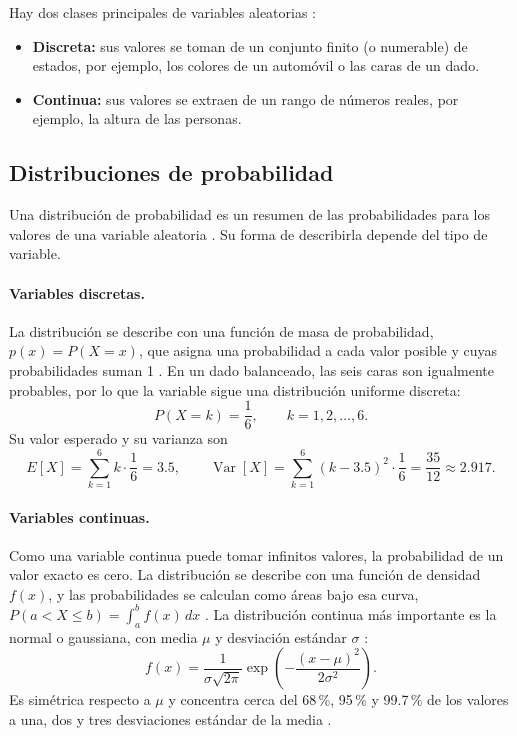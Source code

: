 \documentclass[11pt,letterpaper]{article}
\begin{document}
Hay dos clases principales de variables aleatorias \parencite{tecnm2026_documento_fuente,brownlee2020}:

\begin{itemize}
    \item \textbf{Discreta:} sus valores se toman de un conjunto finito (o numerable) de estados, por ejemplo, los colores de un automóvil o las caras de un dado.
    \item \textbf{Continua:} sus valores se extraen de un rango de números reales, por ejemplo, la altura de las personas.
\end{itemize}

\subsection{Distribuciones de probabilidad}

Una distribución de probabilidad es un resumen de las probabilidades para los valores de una variable aleatoria \parencite{tecnm2026_documento_fuente}. Su forma de describirla depende del tipo de variable.

\paragraph{Variables discretas.} La distribución se describe con una función de masa de probabilidad, $p(x) = P(X = x)$, que asigna una probabilidad a cada valor posible y cuyas probabilidades suman 1 \parencite{brownlee2020}. En un dado balanceado, las seis caras son igualmente probables, por lo que la variable sigue una distribución uniforme discreta:
\begin{equation}
    P(X = k) = \frac{1}{6}, \qquad k = 1, 2, \ldots, 6.
\end{equation}
Su valor esperado y su varianza son
\begin{equation}
    E[X] = \sum_{k=1}^{6} k \cdot \frac{1}{6} = 3.5, \qquad
    \operatorname{Var}[X] = \sum_{k=1}^{6} (k - 3.5)^2 \cdot \frac{1}{6} = \frac{35}{12} \approx 2.917.
\end{equation}

\paragraph{Variables continuas.} Como una variable continua puede tomar infinitos valores, la probabilidad de un valor exacto es cero. La distribución se describe con una función de densidad $f(x)$, y las probabilidades se calculan como áreas bajo esa curva, $P(a < X \leq b) = \int_a^b f(x)\,dx$ \parencite{tecnm2026_documento_fuente,brownlee2020}. La distribución continua más importante es la normal o gaussiana, con media $\mu$ y desviación estándar $\sigma$ \parencite{tecnm2026_documento_fuente}:
\begin{equation}
    f(x) = \frac{1}{\sigma \sqrt{2\pi}} \exp\!\left( -\frac{(x - \mu)^2}{2\sigma^2} \right).
\end{equation}
Es simétrica respecto a $\mu$ y concentra cerca del 68\,\%, 95\,\% y 99.7\,\% de los valores a una, dos y tres desviaciones estándar de la media \parencite{bonamente2017}.
\end{document}
